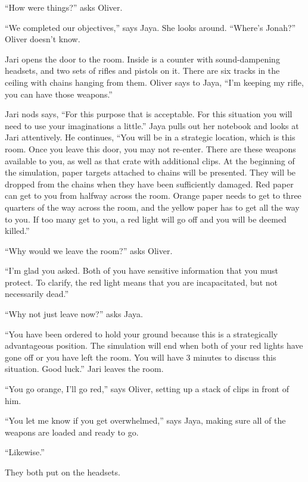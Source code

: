 ``How were things?'' asks Oliver.

``We completed our objectives,'' says Jaya.  She looks around.  ``Where's Jonah?''  Oliver doesn't know.



Jari opens the door to the room. Inside is a counter with sound-dampening headsets, and two sets of rifles and pistols on it.  There are six tracks in the ceiling with chains hanging from them.  Oliver says to Jaya, ``I'm keeping my rifle, you can have those weapons.''



Jari nods says, ``For this purpose that is acceptable.  For this situation you will need to use your imaginations a little.''  Jaya pulls out her notebook and looks at Jari attentively.  He continues, ``You will be in a strategic location, which is this room.  Once you leave this door, you may not re-enter.  There are these weapons available to you, as well as that crate with additional clips.  At the beginning of the simulation, paper targets attached to chains will be presented.  They will be dropped from the chains when they have been sufficiently damaged.  Red paper can get to you from halfway across the room.  Orange paper needs to get to three quarters of the way across the room, and the yellow paper has to get all the way to you.  If too many get to you, a red light will go off and you will be deemed killed.''

``Why would we leave the room?'' asks Oliver.

``I'm glad you asked.  Both of you have sensitive information that you must protect.  To clarify, the red light means that you are incapacitated, but not necessarily dead.''

``Why not just leave now?'' asks Jaya.

``You have been ordered to hold your ground because this is a strategically advantageous position.  The simulation will end when both of your red lights have gone off or you have left the room.  You will have 3 minutes to discuss this situation.  Good luck.''  Jari leaves the room.



``You go orange, I'll go red,'' says Oliver, setting up a stack of clips in front of him.

``You let me know if you get overwhelmed,'' says Jaya, making sure all of the weapons are loaded and ready to go.  

``Likewise.''

They both put on the headsets.

